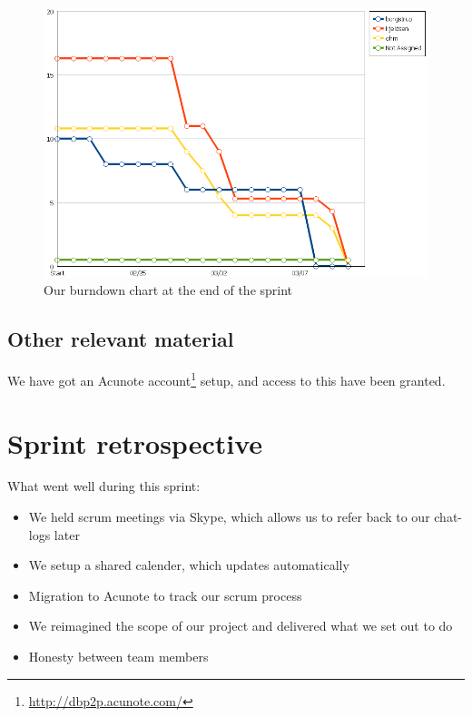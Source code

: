 \documentclass[a4paper,11pt]{article}
\begin{document}
\begin{figure}[ht!]
	\begin{center}
	\includegraphics[width=\textwidth]{burndown.png}		
	\end{center}
	\caption{Our burndown chart at the end of the sprint}
	\label{burndown}
\end{figure}

\subsection{Other relevant material}
We have got an Acunote account\footnote{\url{http://dbp2p.acunote.com/}} setup, and access to this have been granted.

\clearpage
\section{Sprint retrospective}

What went well during this sprint:

\begin{itemize}
	\item We held scrum meetings via Skype, which allows us to refer back to our chat-logs later
	\item We setup a shared calender, which updates automatically
	\item Migration to Acunote to track our scrum process
	\item We reimagined the scope of our project and delivered what we set out to do
	\item Honesty between team members
\end{itemize}
\end{document}
